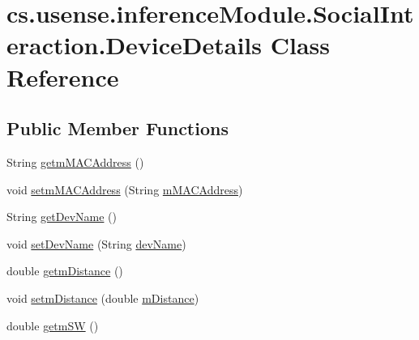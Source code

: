 \hypertarget{classcs_1_1usense_1_1inference_module_1_1_social_interaction_1_1_device_details}{}\section{cs.\+usense.\+inference\+Module.\+Social\+Interaction.\+Device\+Details Class Reference}
\label{classcs_1_1usense_1_1inference_module_1_1_social_interaction_1_1_device_details}
\subsection*{Public Member Functions}
\begin{DoxyCompactItemize}
\item 
String \hyperlink{classcs_1_1usense_1_1inference_module_1_1_social_interaction_1_1_device_details_ae418676bee1c172bab1c8291233c8574}{getm\+M\+A\+C\+Address} ()
\item 
void \hyperlink{classcs_1_1usense_1_1inference_module_1_1_social_interaction_1_1_device_details_a3769185a5b9edf58fd4e43549fe5fd6d}{setm\+M\+A\+C\+Address} (String \hyperlink{classcs_1_1usense_1_1inference_module_1_1_social_interaction_1_1_device_details_a3449094768805dda10bcc72250d1ee77}{m\+M\+A\+C\+Address})
\item 
String \hyperlink{classcs_1_1usense_1_1inference_module_1_1_social_interaction_1_1_device_details_a6d21f81f08ca9a573dd5fb9786326764}{get\+Dev\+Name} ()
\item 
void \hyperlink{classcs_1_1usense_1_1inference_module_1_1_social_interaction_1_1_device_details_a42af7fb4b9994010f713076913d5d5ba}{set\+Dev\+Name} (String \hyperlink{classcs_1_1usense_1_1inference_module_1_1_social_interaction_1_1_device_details_a904987ecb833312644ff70e64d3e0342}{dev\+Name})
\item 
double \hyperlink{classcs_1_1usense_1_1inference_module_1_1_social_interaction_1_1_device_details_a06492b6c4ff984713a37997099008e32}{getm\+Distance} ()
\item 
void \hyperlink{classcs_1_1usense_1_1inference_module_1_1_social_interaction_1_1_device_details_a303d1a0cd6cd22a16454c4f4eb603abf}{setm\+Distance} (double \hyperlink{classcs_1_1usense_1_1inference_module_1_1_social_interaction_1_1_device_details_a8fc5379488cf281823b2cc460d2b0810}{m\+Distance})
\item 
double \hyperlink{classcs_1_1usense_1_1inference_module_1_1_social_interaction_1_1_device_details_adf2b2f2a4738ec95c5bbcfd31f9ae471}{getm\+S\+W} ()

\end{DoxyCompactItemize}
